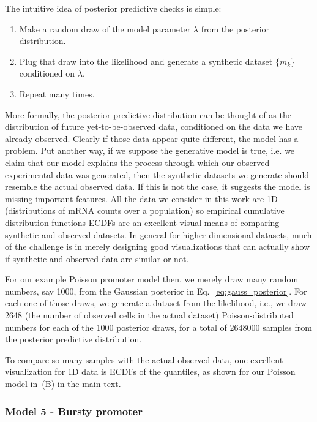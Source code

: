 The intuitive idea of posterior predictive checks is simple: 
\begin{enumerate}
\item Make a random draw of the model parameter $\lambda$ from the posterior
distribution.
\item Plug that draw into the likelihood and generate a synthetic dataset
$\{m_k\}$ conditioned on $\lambda$.
\item Repeat many times.
\end{enumerate}
More formally, the posterior predictive distribution can be thought of as the
distribution of future yet-to-be-observed data, conditioned on the data we have
already observed. Clearly if those data appear quite different, the model has a
problem. Put another way, if we suppose the generative model is true, i.e. we
claim that our model explains the process through which our observed
experimental data was generated, then the synthetic datasets we generate should
resemble the actual observed data. If this is not the case, it suggests the
model is missing important features. All the data we consider in this work are
1D (distributions of mRNA counts over a population) so empirical cumulative
distribution functions ECDFs are an excellent visual means of comparing
synthetic and observed datasets. In general for higher dimensional datasets,
much of the challenge is in merely designing good visualizations that can
actually show if synthetic and observed data are similar or not.

For our example Poisson promoter model then, we merely draw many random numbers,
say 1000, from the Gaussian posterior in Eq.~\ref{eq:gauss_posterior}. For each
one of those draws, we generate a dataset from the likelihood, i.e., we draw
2648 (the number of observed cells in the actual dataset) Poisson-distributed
numbers for each of the 1000 posterior draws, for a total of 2648000 samples
from the posterior predictive distribution.

To compare so many samples with the actual observed data, one excellent
visualization for 1D data is ECDFs of the quantiles, as shown for our Poisson
model in~(B) in the main text. 

\subsubsection{Model 5 - Bursty promoter}

